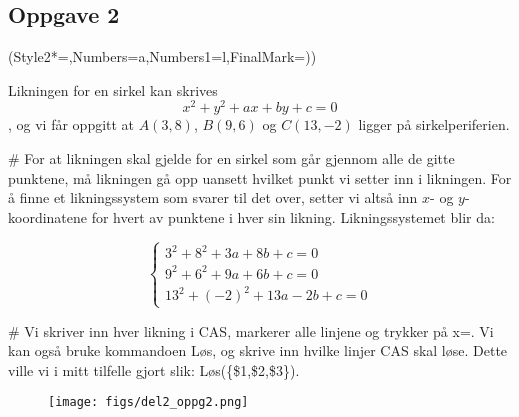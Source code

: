 \subsection*{Oppgave 2}

\begin{easylist}[enumerate]
	\ListProperties(Style2*=,Numbers=a,Numbers1=l,FinalMark={)})

	Likningen for en sirkel kan skrives $$x^2 + y^2 + ax + by + c = 0$$, og vi får oppgitt at $A(3,8)$, $B(9,6)$ og $C(13,-2)$ ligger på sirkelperiferien. 
	
	# For at likningen skal gjelde for en sirkel som går gjennom alle de gitte punktene, må likningen gå opp uansett hvilket punkt vi setter inn i likningen. For å finne et likningssystem som svarer til det over, setter vi altså inn $x$- og $y$-koordinatene for hvert av punktene i hver sin likning. Likningssystemet blir da:
	
	\begin{equation*}
		\begin{cases} 3^2 + 8^2 + 3a + 8b + c = 0
		\\ 9^2 + 6^2 + 9a + 6b + c = 0 
		\\ 13^2 + (-2)^2 + 13a - 2b + c = 0 
		\end{cases}
	\end{equation*}
	
	# Vi skriver inn hver likning i CAS, markerer alle linjene og trykker på x=. Vi kan også bruke kommandoen Løs, og skrive inn hvilke linjer CAS skal løse. Dette ville vi i mitt tilfelle gjort slik: Løs(\{\$1,\$2,\$3\}).

	\begin{figure}[ht!]
		\centering
		\texttt{[image: figs/del2\_oppg2.png]}
		\label{fig:del1_oppg7}
	\end{figure}

\end{easylist}


